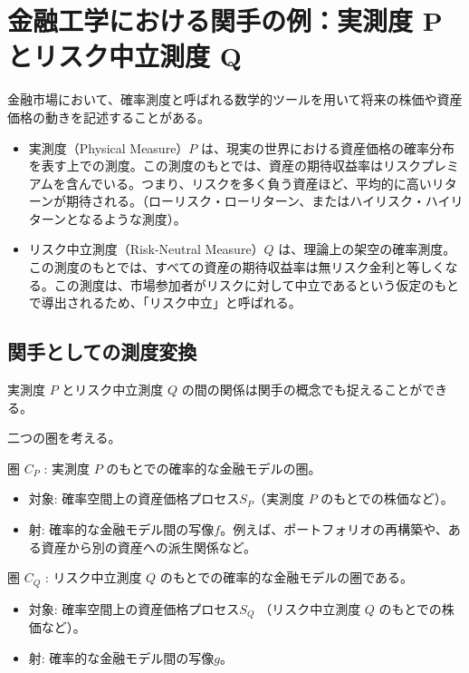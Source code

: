 \documentclass[uplatex,a4j,12pt,dvipdfmx]{jsarticle}
\begin{document}
\section{金融工学における関手の例：実測度 P とリスク中立測度 Q}

金融市場において、確率測度と呼ばれる数学的ツールを用いて将来の株価や資産価格の動きを記述することがある。

\begin{itemize}
	\item 実測度（Physical Measure）$P$ は、現実の世界における資産価格の確率分布を表す上での測度。この測度のもとでは、資産の期待収益率はリスクプレミアムを含んでいる。つまり、リスクを多く負う資産ほど、平均的に高いリターンが期待される。（ローリスク・ローリターン、またはハイリスク・ハイリターンとなるような測度）。
	\item リスク中立測度（Risk-Neutral Measure）$Q$ は、理論上の架空の確率測度。この測度のもとでは、すべての資産の期待収益率は無リスク金利と等しくなる。この測度は、市場参加者がリスクに対して中立であるという仮定のもとで導出されるため、「リスク中立」と呼ばれる。
\end{itemize}

\subsection{関手としての測度変換}

実測度 $P$ とリスク中立測度 $Q$ の間の関係は関手の概念でも捉えることができる。

\medskip

二つの圏を考える。

圏 $C_{P}$ : 実測度 $P$ のもとでの確率的な金融モデルの圏。
\begin{itemize}
	\item 対象: 確率空間上の資産価格プロセス$S_{P}$（実測度 $P$ のもとでの株価など）。
	\item 射: 確率的な金融モデル間の写像$f$。例えば、ポートフォリオの再構築や、ある資産から別の資産への派生関係など。
\end{itemize}

\medskip

圏 $C_{Q}$ : リスク中立測度 $Q$ のもとでの確率的な金融モデルの圏である。
\begin{itemize}
	\item 対象: 確率空間上の資産価格プロセス$S_{Q}$ （リスク中立測度 $Q$ のもとでの株価など）。
	\item 射: 確率的な金融モデル間の写像$g$。
\end{itemize}
\end{document}
